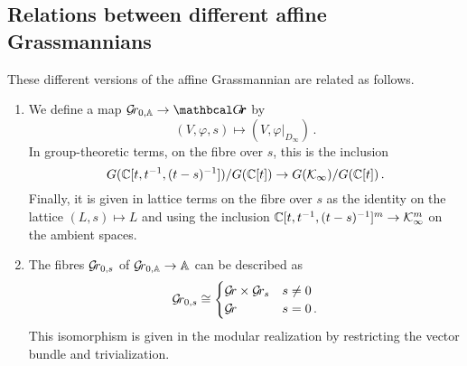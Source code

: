 \documentclass[draft]{article}
\begin{document}
\subsection{Relations between different affine Grassmannians}
\label{ss:relsbtwgrs}
% 
These different versions of the affine Grassmannian are related as follows.  
% 
\begin{enumerate}
    \item \label{it:bd-th}
    We define a map $ \Grbd \rightarrow \Grth $ by 
    $$
        (V,\varphi,s)\mapsto (V, \varphi \big|_{D_\infty})\,.
    $$
    In group-theoretic terms, on the fibre over $ s $, this is the inclusion
    $$
        G(\mathbb C[t, t^{-1}, (t-s)^{-1}])/ G(\mathbb C[t]) \rightarrow G(\mathcal K_\infty)/G(\mathbb C[t])\,. 
    $$
    Finally, it is given in lattice terms on the fibre over $s$ as the identity on the lattice $(L,s)\mapsto L$ and using the inclusion $\mathbb C[t, t^{-1}, (t-s)^{-1}]^m \rightarrow \mathcal K_\infty^m$ on the ambient spaces.
    \item \label{it:polyno-taylor}
    The fibres $ \mathcal{G}\!r_{0,s}$ of $ {\mathcal{G}\!r_{0,\mathbb A}} \rightarrow \mathbb A$ can be described as %
    \begin{equation*}
    \mathcal{G}\!r_{0,s} \cong 
        \begin{cases} 
            \mathcal{G}\!r \times \mathcal{G}\!r_s & s \ne 0 \\
            \mathcal{G}\!r              & s = 0\,.
        \end{cases}
    \end{equation*}
    This isomorphism is given in the modular realization by restricting the vector bundle and trivialization.    
    

\end{enumerate}
\end{document}
